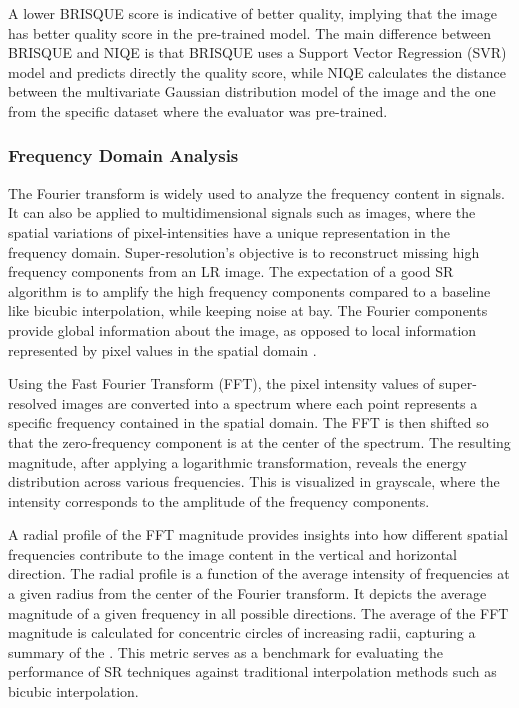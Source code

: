             A lower BRISQUE score is indicative of better quality, implying that the image has better quality score in the pre-trained model. The main difference between BRISQUE and NIQE is that BRISQUE uses a Support Vector Regression (SVR) model and predicts directly the quality score, while NIQE calculates the distance between the multivariate Gaussian distribution model of the image and the one from the specific dataset where the evaluator was pre-trained.




        \subsubsection{Frequency Domain Analysis} \label{subsubsec:frequency_domain_analysis}
        
        The Fourier transform is widely used to analyze the frequency content in signals.
        It can also be applied to multidimensional signals such as images, where the spatial variations of pixel-intensities have a unique representation in the frequency domain. 
        Super-resolution's objective is to reconstruct missing high frequency components from an LR image.
        The expectation of a good SR algorithm is to amplify the high frequency components compared to a baseline like bicubic interpolation, while keeping noise at bay.
        The Fourier components provide global information about the image, as opposed to local information represented by pixel values in the spatial domain \cite{fuoli2021fourier}. 
        
        Using the Fast Fourier Transform (FFT), the pixel intensity values of super-resolved images are converted into a spectrum where each point represents a specific frequency contained in the spatial domain.
        The FFT is then shifted so that the zero-frequency component is at the center of the spectrum. 
        The resulting magnitude, after applying a logarithmic transformation, reveals the energy distribution across various frequencies.
        This is visualized in grayscale, where the intensity corresponds to the amplitude of the frequency components.
        
        A radial profile of the FFT magnitude provides insights into how different spatial frequencies contribute to the image content in the vertical and horizontal direction.
        The radial profile is a function of the average intensity of frequencies at a given radius from the center of the Fourier transform. It depicts the average magnitude of a given frequency in all possible directions. 
        The average of the FFT magnitude is calculated for concentric circles of increasing radii, capturing a summary of the .
        This metric serves as a benchmark for evaluating the performance of SR techniques against traditional interpolation methods such as bicubic interpolation.
        
